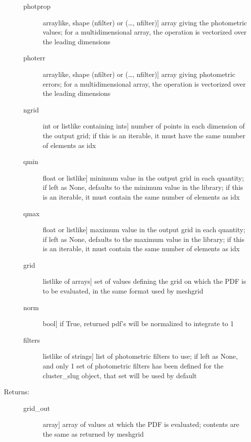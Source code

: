 \documentclass[letterpaper,10pt,english]{sphinxmanual}
\begin{document}
\begin{fulllineitems}
\begin{fulllineitems}
\begin{description}
\begin{description}
\item[{photprop}] \leavevmode{[}arraylike, shape (nfilter) or (…, nfilter){]}
array giving the photometric values; for a
multidimensional array, the operation is vectorized over
the leading dimensions

\item[{photerr}] \leavevmode{[}arraylike, shape (nfilter) or (…, nfilter){]}
array giving photometric errors; for a multidimensional
array, the operation is vectorized over the leading
dimensions

\item[{ngrid}] \leavevmode{[}int or listlike containing ints{]}
number of points in each dimension of the output grid;
if this is an iterable, it must have the same number of
elements as idx

\item[{qmin}] \leavevmode{[}float or listlike{]}
minimum value in the output grid in each quantity; if
left as None, defaults to the minimum value in the
library; if this is an iterable, it must contain the
same number of elements as idx

\item[{qmax}] \leavevmode{[}float or listlike{]}
maximum value in the output grid in each quantity; if
left as None, defaults to the maximum value in the
library; if this is an iterable, it must contain the
same number of elements as idx

\item[{grid}] \leavevmode{[}listlike of arrays{]}
set of values defining the grid on which the PDF is to
be evaluated, in the same format used by meshgrid

\item[{norm}] \leavevmode{[}bool{]}
if True, returned pdf’s will be normalized to integrate
to 1

\item[{filters}] \leavevmode{[}listlike of strings{]}
list of photometric filters to use; if left as None, and
only 1 set of photometric filters has been defined for
the cluster\_slug object, that set will be used by
default

\end{description}

\item[{Returns:}] \leavevmode\begin{description}
\item[{grid\_out}] \leavevmode{[}array{]}
array of values at which the PDF is evaluated; contents
are the same as returned by meshgrid


\end{description}
\end{description}
\end{fulllineitems}
\end{fulllineitems}
\end{document}
